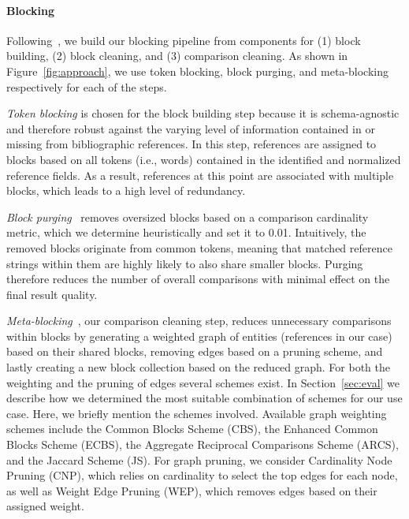 \paragraph{Blocking}
Following~\cite{Papadakis2016}, we build our blocking pipeline from components for (1) block building, (2) block cleaning, and (3) comparison cleaning. As shown in Figure~\ref{fig:approach}, we use token blocking, block purging, and meta-blocking respectively for each of the steps.

\emph{Token blocking} is chosen for the block building step because it is schema-agnostic and therefore robust against the varying level of information contained in or missing from bibliographic references. In this step, references are assigned to blocks based on all tokens (i.e., words) contained in the identified and normalized reference fields. As a result, references at this point are associated with multiple blocks, which leads to a high level of redundancy.

\emph{Block purging}~\cite{Papadakis2011blockpurging} removes oversized blocks based on a comparison cardinality metric, which we determine heuristically and set it to 0.01. Intuitively, the removed blocks originate from common tokens, meaning that matched reference strings within them are highly likely to also share smaller blocks. Purging therefore reduces the number of overall comparisons with minimal effect on the final result quality.

\emph{Meta-blocking}~\cite{Papadakis2014}, our comparison cleaning step, reduces unnecessary comparisons within blocks by generating a weighted graph of entities (references in our case) based on their shared blocks, removing edges based on a pruning scheme, and lastly creating a new block collection based on the reduced graph. For both the weighting and the pruning of edges several schemes exist. In Section~\ref{sec:eval} we describe how we determined the most suitable combination of schemes for our use case. Here, we briefly mention the schemes involved. Available graph weighting schemes include the Common Blocks Scheme (CBS), the Enhanced Common Blocks Scheme (ECBS), the Aggregate Reciprocal Comparisons Scheme (ARCS), and the Jaccard Scheme (JS). For graph pruning, we consider Cardinality Node Pruning (CNP), which relies on cardinality to select the top edges for each node, as well as Weight Edge Pruning (WEP), which removes edges based on their assigned weight.

